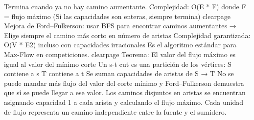 \markdownRendererUlEndTight \markdownRendererInterblockSeparator
{}Termina cuando ya no hay camino aumentante.\markdownRendererSoftLineBreak
{}Complejidad: O(E * F) donde F = flujo máximo\markdownRendererSoftLineBreak
{}(Si las capacidades son enteras, siempre termina)\markdownRendererParagraphSeparator
{}\markdownRendererInterblockSeparator
{}\markdownRendererDollarSign{}\markdownRendererBackslash{}clearpage\markdownRendererDollarSign{}\markdownRendererInterblockSeparator
{}
\markdownRendererSectionEnd \markdownRendererSectionBegin
{}\markdownRendererInterblockSeparator
{}Mejora de Ford–Fulkerson: usar BFS para encontrar caminos aumentantes\markdownRendererSoftLineBreak
{}→ Elige siempre el camino más corto en número de aristas\markdownRendererParagraphSeparator
{}Complejidad garantizada:\markdownRendererSoftLineBreak
{}O(V * E\markdownRendererCircumflex{}2) incluso con capacidades irracionales\markdownRendererParagraphSeparator
{}Es el algoritmo estándar para Max-Flow en competiciones.\markdownRendererInterblockSeparator
{}\markdownRendererInterblockSeparator
{}\markdownRendererDollarSign{}\markdownRendererBackslash{}clearpage\markdownRendererDollarSign{}\markdownRendererInterblockSeparator
{}
\markdownRendererSectionEnd \markdownRendererSectionBegin
{}\markdownRendererInterblockSeparator
{}Teorema:\markdownRendererSoftLineBreak
{}El valor del flujo máximo es igual al valor del mínimo corte\markdownRendererParagraphSeparator
{}Un s-t cut es una partición de los vértices:\markdownRendererInterblockSeparator
{}\markdownRendererUlBeginTight
\markdownRendererUlItem S contiene a s\markdownRendererUlItemEnd 
\markdownRendererUlItem T contiene a t\markdownRendererSoftLineBreak
{}Se suman capacidades de aristas de S → T\markdownRendererUlItemEnd 
\markdownRendererUlEndTight \markdownRendererInterblockSeparator
{}No se puede mandar más flujo del valor del corte mínimo\markdownRendererSoftLineBreak
{}y Ford–Fulkerson demuestra que sí se puede llegar a ese valor.\markdownRendererInterblockSeparator
{}\markdownRendererInterblockSeparator
{}\markdownRendererSectionBegin
{}\markdownRendererInterblockSeparator
{}Los caminos disjuntos en aristas se encuentran asignando capacidad 1 a cada arista y calculando el flujo máximo. Cada unidad de flujo representa un camino independiente entre la fuente y el sumidero.\markdownRendererParagraphSeparator
